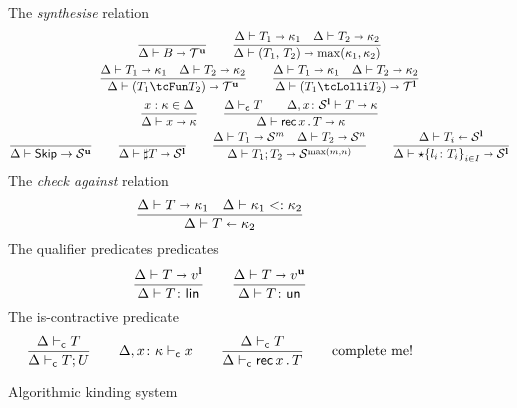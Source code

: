 \begin{figure}[h!]
  The \emph{synthesise} relation \hfill{}
  \begin{gather*}
    \frac{}{\algkindout{\tcBase}{\kindt^\Un}}
    \qquad 
    \frac{
      \algkindout{T_1}{\kind_1}
      \quad
      \algkindout{T_2}{\kind_2}
    }{
      \algkindout{\tPair{T_1}{T_2}}{\max(\kind_1, \kind_2)}
    }
    \\
    \frac{
      \algkindout{T_1}{\kind_1}
      \quad
      \algkindout{T_2}{\kind_2}
    }{
      \algkindout{(\tUnFun{T_1}{T_2})}{\kindt^\Un}
      }
    \qquad
    \frac{
      \algkindout{T_1}{\kind_1}
      \quad
      \algkindout{T_2}{\kind_2}
    }{
      \algkindout{(\tLinFun{T_1}{T_2})}{\kindt^\Lin}
    }
    \\
    \frac{x : \kind \in \kindEnv}{\algkindout x \kind}
   \qquad
   \frac{
     \contractive T
     \qquad
     \algkindout[\kindEnv, x\colon \kinds^\Lin] T \kind
   }{
     \algkindout{\tRec xT}{\kind}
   }
    \\
    \frac{}{\kindEnv \Alg \tskip \rightarrow \kinds^\Un}
    \qquad 
    \frac{}{\algkindout{\tMsg T}{\kinds^\Lin}}
    \qquad
    \frac{
      \algkindout{T_1}{\kinds^m}
      \quad
      \algkindout{T_2}{\kinds^n}
    }{
      \algkindout{\tSemi{T_1}{T_2}}{\kinds^{\max(m,n)}}
    }
    \qquad
    \frac{
      \algkindin{T_i}{\kinds^\Lin}
    }{
      \algkindout{\tChoice{\{l_i\colon T_i\}}_{i\in I}}{\kinds^\Lin}
    }
  \end{gather*}
  The \emph{check against} relation\hfill{}
  \begin{equation*}
    \frac{
      \algkindout{T}{\kind_1}
      \quad
      \subkind{\kind_1}{\kind_2}
    }{
      \algkindin T {\kind_2}
    }
  \end{equation*}
  The qualifier predicates predicates  \hfill{}
  \begin{equation*}
    \frac{
      \algkindout T {v^\Lin}
    }{
      \isLin T
    }
    \qquad
    \frac{
      \algkindout T {v^\Un}
    }{
      \isUn T
    }
  \end{equation*}
  The is-contractive predicate  \hfill{}\quad{}
  \begin{equation*}
    \frac{
      \contractive{T}
    }{
      \contractive{T;U}
    }
    \qquad
    \contractive[\kindEnv,x\colon\kind]{x}
    \qquad 
    \frac{
      \contractive{T}
    }{
      \contractive{\tRecK xT}
    }
    \qquad
    \text{complete me!}
  \end{equation*}
  \caption{Algorithmic kinding system}
  \label{fig:kinding-system}
\end{figure}

